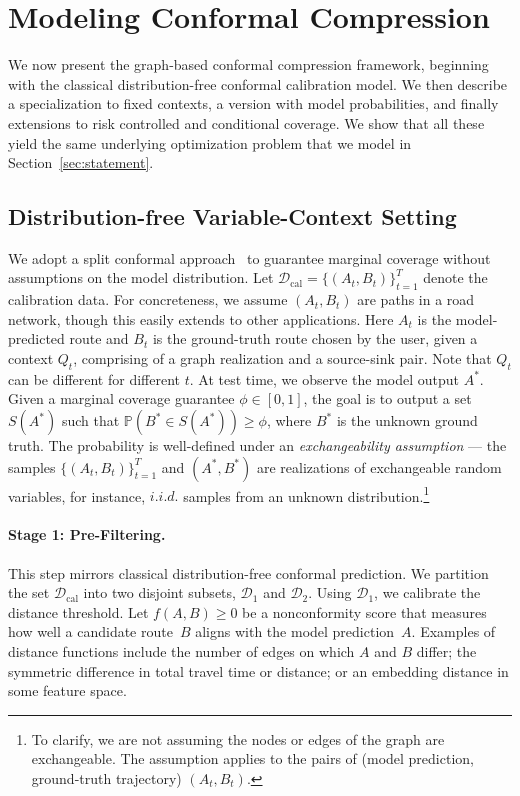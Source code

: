 \section{Modeling Conformal Compression}
\label{sec:model}

We now present the  graph-based conformal compression framework, beginning with the classical distribution-free conformal calibration model.  We then describe a specialization to fixed contexts, a version with model probabilities, and finally extensions to risk controlled and conditional coverage. We show that all these yield the same underlying optimization problem that we model in Section~\ref{sec:statement}.

\subsection{Distribution-free Variable-Context Setting}
\label{sec:free}
We adopt a split conformal approach~\cite{lei2013distribution,angelopoulos2021gentle} to guarantee marginal coverage without assumptions on the model distribution. Let $\mathcal{D}_{\text{cal}} = \{(A_t, B_t)\}_{t=1}^T$ denote the calibration data. For concreteness, we assume $(A_t,B_t)$ are paths in a road network, though this easily extends to other applications. Here $A_t$ is the model-predicted route and $B_t$ is the ground-truth route chosen by the user, given a context $Q_t$, comprising of a graph realization and a source-sink pair. Note that $Q_t$ can be different for different $t$. At test time, we observe the model output $A^*$. Given a marginal coverage guarantee $\phi \in [0,1]$, the goal is to output a set $S(A^*)$ such that $\mathbb{P}(B^* \in S(A^*)) \ge \phi$, where $B^*$ is the unknown ground truth. The probability is well-defined under an {\em exchangeability assumption} --- the samples $\{(A_t,B_t)\}_{t=1}^T$ and $(A^*,B^*)$ are realizations of exchangeable random variables, for instance, $i.i.d.$ samples from an unknown distribution.\footnote{To clarify, we are not assuming the nodes or edges of the graph are exchangeable. The assumption applies to the pairs of (model prediction, ground-truth trajectory) $(A_t, B_t)$.} 

\paragraph{Stage 1: Pre-Filtering.} This step mirrors classical distribution-free conformal prediction. We partition the set $\mathcal D_{\text{cal}}$ into two disjoint subsets, $\mathcal{D}_1$ and $\mathcal{D}_2$. Using $\mathcal{D}_1$, we calibrate the distance threshold. Let $f(A, B) \ge 0$ be a nonconformity score that measures how well a candidate route~$B$ aligns with the model prediction~$A$. Examples  of distance functions include the number of edges on which $A$ and $B$ differ; the symmetric difference in total travel time or distance; or an embedding distance in some feature space. 

